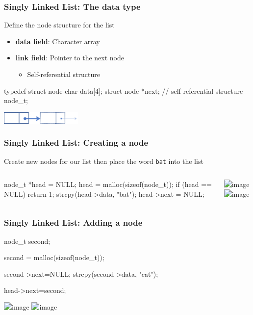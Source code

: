 \documentclass[newPxFont,sthlmFooter,nooffset]{beamer}
\begin{document}
\begin{frame}[t, fragile]
  \frametitle{Singly Linked List: The data type}
  Define the node structure for the list
  \begin{itemize}
  \item \textbf{data field}: Character array
  \item \textbf{link field}: Pointer to the next node
    \begin{itemize}
    \item Self-referential structure
    \end{itemize}
  \end{itemize}

  \begin{ncodedef}
typedef struct node {
    char data[4];
    struct node *next; // self-referential structure
} node_t;
  \end{ncodedef}
  \begin{center}
    \includegraphics[width=4cm]{figures/fig04_node.png}
  \end{center}

\end{frame}

\begin{frame}[t, fragile]
  \frametitle{Singly Linked List: Creating a node}
Create new nodes for our list then place the word \texttt{bat} into the
list
\begin{columns}
  \begin{column}{0.5\textwidth}
    \begin{ncodedef}
node_t *head = NULL;
head = malloc(sizeof(node_t));
if (head == NULL) {
    return 1;
}
strcpy(head->data, "bat");
head->next = NULL;
\end{ncodedef}

  \end{column}
  \begin{column}{0.5\textwidth}
    \includegraphics<1>[width=6cm]{figures/fig05_head.png}
    \includegraphics<2>[width=6cm]{figures/fig05_head1.png}
  \end{column}
\end{columns}
\end{frame}

\begin{frame}[t, fragile]
  \frametitle{Singly Linked List: Adding a node}
\begin{ncodedef}
node_t second; 
    
second = malloc(sizeof(node_t)); 
  
second->next=NULL;
strcpy(second->data, "cat");
  
head->next=second;
\end{ncodedef}
    \includegraphics<1>[width=0.9\textwidth]{figures/fig05_second1.png}
    \includegraphics<2>[width=0.9\textwidth]{figures/fig05_second2.png}
\end{frame}
\end{document}
